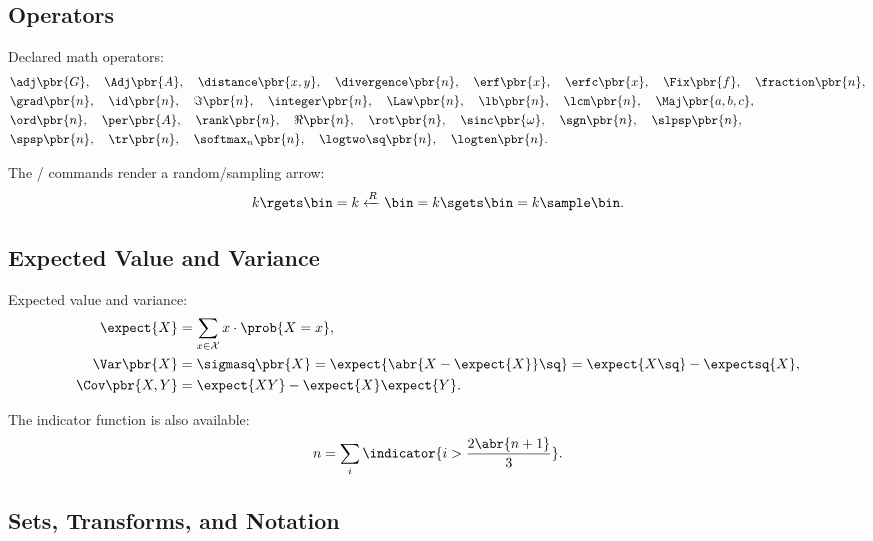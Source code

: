 \subsection{Operators}

Declared math operators:
\begin{align*}
  &\adj\pbr{G},
  \quad \Adj\pbr{A},
  \quad \distance\pbr{x, y},
  \quad \divergence\pbr{n},
  \quad \erf\pbr{x},
  \quad \erfc\pbr{x},
  \quad \Fix\pbr{f},
  \quad \fraction\pbr{n}, \\
  &\grad\pbr{n},
  \quad \id\pbr{n},
  \quad \Im\pbr{n},
  \quad \integer\pbr{n},
  \quad \Law\pbr{n},
  \quad \lb\pbr{n},
  \quad \lcm\pbr{n},
  \quad \Maj\pbr{a, b, c}, \\
  &\ord\pbr{n},
  \quad \per\pbr{A},
  \quad \rank\pbr{n},
  \quad \Re\pbr{n},
  \quad \rot\pbr{n},
  \quad \sinc\pbr{\omega},
  \quad \sgn\pbr{n},
  \quad \slpsp\pbr{n}, \\
  &\spsp\pbr{n},
  \quad \tr\pbr{n},
  \quad \softmax_n\pbr{n},
  \quad \logtwo\sq\pbr{n},
  \quad \logten\pbr{n}.
\end{align*}

The / commands render a random\-/sampling arrow:
\begin{equation*}
  k \rgets \bin = k \xleftarrow{R} \bin = k \sgets \bin = k \sample \bin.
\end{equation*}

\subsection{Expected Value and Variance}

Expected value and variance:
\begin{align*}
  \expect{X}     &= \sum_{x \in \mathcal{X}} x \cdot \prob{X = x},                                     \\
  \Var\pbr{X}    &= \sigmasq\pbr{X} = \expect{\abr{X - \expect{X}}\sq} = \expect{X\sq} - \expectsq{X}, \\
  \Cov\pbr{X, Y} &= \expect{XY} - \expect{X}\expect{Y}.
\end{align*}

\noindent
The indicator function is also available:
\begin{equation*}
  n = \sum_i \indicator{i > \frac{2\abr{n + 1}}{3}}.
\end{equation*}

\subsection{Sets, Transforms, and Notation}


